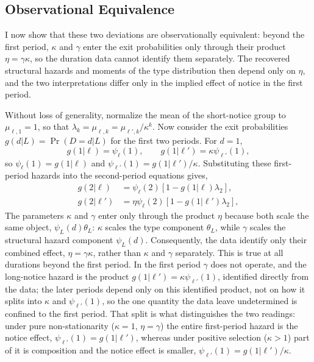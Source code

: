 \documentclass{div}
\begin{document}
\subsection{Observational Equivalence}

I now show that these two deviations are observationally equivalent: beyond the first period, $\kappa$ and $\gamma$ enter the exit probabilities only through their product $\eta = \gamma\kappa$, so the duration data cannot identify them separately. The recovered structural hazards and moments of the type distribution then depend only on $\eta$, and the two interpretations differ only in the implied effect of notice in the first period.

Without loss of generality, normalize the mean of the short-notice group to $\mu_{\ell,1}=1$, so that $\lambda_k=\mu_{\ell,k}=\mu_{\ell',k}/\kappa^k$. Now consider the exit probabilities $g(d|L)=\Pr(D=d|L)$ for the first two periods. For $d=1$,
\[
  g(1|\ell)=\psi_\ell(1), \qquad g(1|\ell')=\kappa\psi_{\ell'}(1),
\]
so $\psi_\ell(1)=g(1|\ell)$ and $\psi_{\ell'}(1)=g(1|\ell')/\kappa$. Substituting these first-period hazards into the second-period equations gives, 
\begin{align*}
  g(2|\ell)  &= \psi_\ell(2)[1-g(1|\ell)\lambda_2], \\
  g(2|\ell') &= \eta\psi_\ell(2)[1-g(1|\ell')\lambda_2],
\end{align*}
The parameters $\kappa$ and $\gamma$ enter only through the product $\eta$ because both scale the same object, $\psi_L(d)\theta_L$: $\kappa$ scales the type component $\theta_L$, while $\gamma$ scales the structural hazard component $\psi_L(d)$. Consequently, the data identify only their combined effect, $\eta=\gamma\kappa$, rather than $\kappa$ and $\gamma$ separately. This is true at all durations beyond the first period. In the first period $\gamma$ does not operate, and the long-notice hazard is the product $g(1|\ell')=\kappa\psi_{\ell'}(1)$, identified directly from the data; the later periods depend only on this identified product, not on how it splits into $\kappa$ and $\psi_{\ell'}(1)$, so the one quantity the data leave undetermined is confined to the first period. That split is what distinguishes the two readings: under pure non-stationarity ($\kappa=1$, $\eta=\gamma$) the entire first-period hazard is the notice effect, $\psi_{\ell'}(1)=g(1|\ell')$, whereas under positive selection ($\kappa>1$) part of it is composition and the notice effect is smaller, $\psi_{\ell'}(1)=g(1|\ell')/\kappa$.
\end{document}
